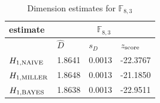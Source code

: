 \documentclass[a4paper,10pt]{article}
\begin{document}
\begin{thebibliography}{99}
\begin{table}[H] 
\begin{center}
\caption{Dimension estimates for $\mathbb{F}_{8,3}$}
\label{tab:est4s}
\begin{tabular}{|l|l|l|l|}
\hline
 estimate & \multicolumn{3}{c|}{$\mathbb{F}_{8,3}$} \\
\hline
 & $\hat{D}$ & $s_{D}$ & $z_{\mbox{\scriptsize{score}}}$ \\
\hline
$ H_{1,\mbox{\scriptsize{NAIVE}}}  $ & 1.8641 & 0.0013 & -22.3767 \\ 
\hline 
$ H_{1,\mbox{\scriptsize{MILLER}}} $ & 1.8648 & 0.0013 & -21.1850 \\ 
\hline 
$ H_{1,\mbox{\scriptsize{BAYES}}} $ & 1.8638 & 0.0013 & -22.9511 \\ 
\hline 
\end{tabular}
\end{center}
\end{table}



\newpage



\end{thebibliography}
\end{document}

